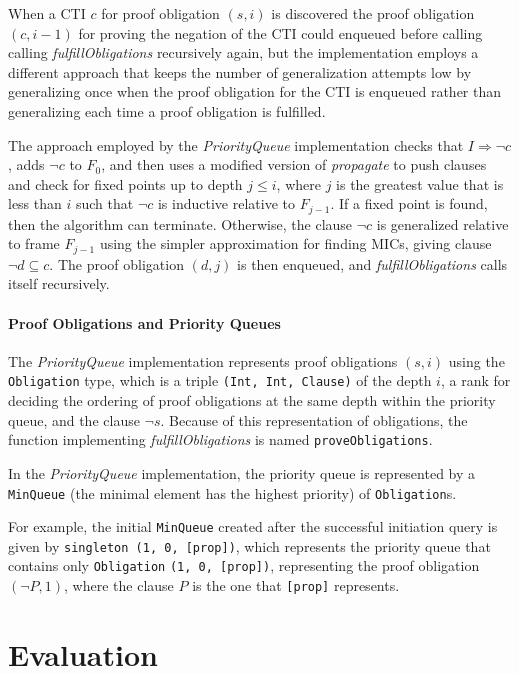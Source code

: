 \documentclass[12pt,a4paper,twoside,openright]{report}
\begin{document}
{When a CTI $c$ for proof obligation $(s,i)$ is discovered the proof obligation $(c,i - 1)$
for proving the negation of the CTI could enqueued before calling
calling {\it fulfillObligations} recursively again,
but the implementation employs a different approach that keeps the number of
generalization attempts low by generalizing once when the proof obligation
for the CTI is enqueued rather than generalizing each time a proof obligation
is fulfilled.

The approach employed by the {\it PriorityQueue} implementation checks
that $I \Rightarrow \neg c$, adds $\neg c$ to $F_0$, and then uses a modified
version of {\it propagate} to push clauses and check for fixed points up to
depth $j \leq i$, where $j$ is the greatest value that is less than $i$
such that $\neg c$ is inductive relative to $F_{j - 1}$. If a fixed point is
found, then the algorithm can terminate. Otherwise, the clause
$\neg c$ is generalized relative to frame $F_{j - 1}$
using the simpler approximation for finding MICs, giving clause
$\neg d \subseteq c$. The proof obligation $(d,j)$ is then enqueued, and
{\it fulfillObligations} calls itself recursively.

\subsubsection{Proof Obligations and Priority Queues}

The {\it PriorityQueue} implementation represents proof obligations $(s,i)$ using the
\verb,Obligation, type, which is a triple \verb.(Int, Int, Clause). of the depth $i$, a
rank for deciding the ordering of proof obligations at the same depth within the priority
queue, and the clause $\neg s$. Because of this representation of obligations, the
function implementing {\it fulfillObligations} is named \verb,proveObligations,.

In the \emph{PriorityQueue} implementation, the priority queue is represented by
a \verb,MinQueue, (the minimal element has the highest
priority) of \verb,Obligation,s.

For example, the initial \verb,MinQueue, created after the successful initiation query
is given by \verb.singleton (1, 0, [prop])., which represents the priority queue that
contains only \verb,Obligation, \verb.(1, 0, [prop])., representing the proof obligation
$(\neg P,1)$, where the clause $P$ is the one that \verb,[prop], represents.

\chapter{Evaluation}
\label{eval}

}
\end{document}
